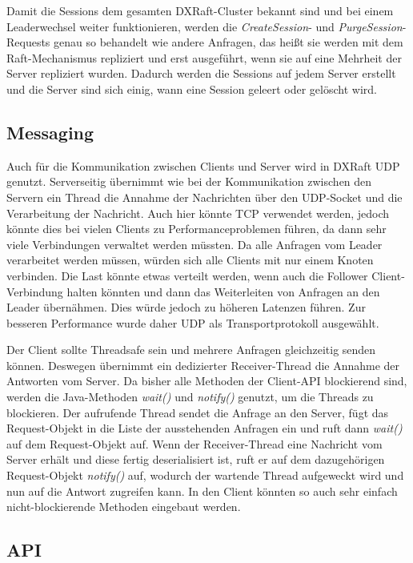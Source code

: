 Damit die Sessions dem gesamten DXRaft-Cluster bekannt sind und bei einem Leaderwechsel weiter funktionieren, werden die \textit{CreateSession}- und \textit{PurgeSession}-Requests genau so behandelt wie andere Anfragen, das heißt sie werden mit dem Raft-Mechanismus repliziert und erst ausgeführt, wenn sie auf eine Mehrheit der Server repliziert wurden. Dadurch werden die Sessions auf jedem Server erstellt und die Server sind sich einig, wann eine Session geleert oder gelöscht wird.

\subsection{Messaging}
\label{client-messaging}

Auch für die Kommunikation zwischen Clients und Server wird in DXRaft UDP genutzt. Serverseitig übernimmt wie bei der Kommunikation zwischen den Servern ein Thread die Annahme der Nachrichten über den UDP-Socket und die Verarbeitung der Nachricht. Auch hier könnte TCP verwendet werden, jedoch könnte dies bei vielen Clients zu Performanceproblemen führen, da dann sehr viele Verbindungen verwaltet werden müssten. Da alle Anfragen vom Leader verarbeitet werden müssen, würden sich alle Clients mit nur einem Knoten verbinden. Die Last könnte etwas verteilt werden, wenn auch die Follower Client-Verbindung halten könnten und dann das Weiterleiten von Anfragen an den Leader übernähmen. Dies würde jedoch zu höheren Latenzen führen. Zur besseren Performance wurde daher UDP als Transportprotokoll ausgewählt.

Der Client sollte Threadsafe sein und mehrere Anfragen gleichzeitig senden können. Deswegen übernimmt ein dedizierter Receiver-Thread die Annahme der Antworten vom Server. Da bisher alle Methoden der Client-API blockierend sind, werden die Java-Methoden \textit{wait()} und  \textit{notify()} genutzt, um die Threads zu blockieren. Der aufrufende Thread sendet die Anfrage an den Server, fügt das Request-Objekt in die Liste der ausstehenden Anfragen ein und ruft dann \textit{wait()} auf dem Request-Objekt auf. Wenn der Receiver-Thread eine Nachricht vom Server erhält und diese fertig deserialisiert ist, ruft er auf dem dazugehörigen Request-Objekt \textit{notify()} auf, wodurch der wartende Thread aufgeweckt wird und nun auf die Antwort zugreifen kann. In den Client könnten so auch sehr einfach nicht-blockierende Methoden eingebaut werden.

\subsection{API}
\label{api}

